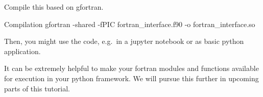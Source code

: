 Compile this based on gfortran. 

\begin{codeonly}{Compilation}
gfortran -shared -fPIC fortran_interface.f90 -o fortran_interface.so
\end{codeonly}

Then, you might use the code, e.g.\ in a jupyter notebook or as basic python application. 

It can be extremely helpful to make your fortran modules and functions available for execution in your python framework. We will pursue this further in upcoming parts of this tutorial.

%


